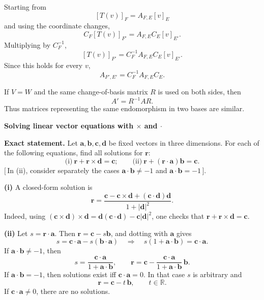 \begin{solution}
Starting from
\[
[T(v)]_F=A_{F,E}[v]_E
\]
and using the coordinate changes,
\[
C_F[T(v)]_{F'}=A_{F,E}C_E[v]_{E'}.
\]
Multiplying by \(C_F^{-1}\),
\[
[T(v)]_{F'}=C_F^{-1}A_{F,E}C_E[v]_{E'}.
\]
Since this holds for every \(v\),
\[
A_{F',E'}=C_F^{-1}A_{F,E}C_E.
\]

If \(V=W\) and the same change-of-basis matrix \(R\) is used on both sides, then
\[
A'=R^{-1}AR.
\]
Thus matrices representing the same endomorphism in two bases are similar.
\end{solution}

\begin{problem}[CP-I-0084]
\label{prob:cp-i-0084}
\textbf{Solving linear vector equations with \(\times\) and \(\cdot\)}

\textbf{Exact statement.}
\hspace*{1.5em}Let \(\mathbf a,\mathbf b,\mathbf c,\mathbf d\) be fixed vectors in three dimensions. For each of the following equations,
find all solutions for \(\mathbf r\):
\[
\text{(i)}\ \mathbf r+\mathbf r\times\mathbf d=\mathbf c;\qquad
\text{(ii)}\ \mathbf r+(\mathbf r\cdot\mathbf a)\mathbf b=\mathbf c.
\]
\([\,\)In (ii), consider separately the cases \(\mathbf a\cdot\mathbf b\ne -1\) and \(\mathbf a\cdot\mathbf b=-1\,]\).

\end{problem}

\begin{solution}
\textbf{(i)} A closed-form solution is
\[
\mathbf r=\frac{\mathbf c-\mathbf c\times\mathbf d+(\mathbf c\cdot\mathbf d)\mathbf d}{1+|\mathbf d|^2}.
\]
Indeed, using \((\mathbf c\times\mathbf d)\times\mathbf d=\mathbf d(\mathbf c\cdot\mathbf d)-\mathbf c|\mathbf d|^2\),
one checks that \(\mathbf r+\mathbf r\times\mathbf d=\mathbf c\).

\medskip
\noindent\textbf{(ii)} Let \(s=\mathbf r\cdot\mathbf a\). Then \(\mathbf r=\mathbf c-s\mathbf b\), and dotting with \(\mathbf a\) gives
\[
s=\mathbf c\cdot\mathbf a-s(\mathbf b\cdot\mathbf a)
\quad\Longrightarrow\quad
s(1+\mathbf a\cdot\mathbf b)=\mathbf c\cdot\mathbf a.
\]
If \(\mathbf a\cdot\mathbf b\ne -1\), then
\[
s=\frac{\mathbf c\cdot\mathbf a}{1+\mathbf a\cdot\mathbf b},
\qquad
\mathbf r=\mathbf c-\frac{\mathbf c\cdot\mathbf a}{1+\mathbf a\cdot\mathbf b}\,\mathbf b.
\]
If \(\mathbf a\cdot\mathbf b=-1\), then solutions exist iff \(\mathbf c\cdot\mathbf a=0\). In that case \(s\) is arbitrary and
\[
\mathbf r=\mathbf c-t\,\mathbf b,\qquad t\in\mathbb R.
\]
If \(\mathbf c\cdot\mathbf a\ne 0\), there are no solutions.
\end{solution}

